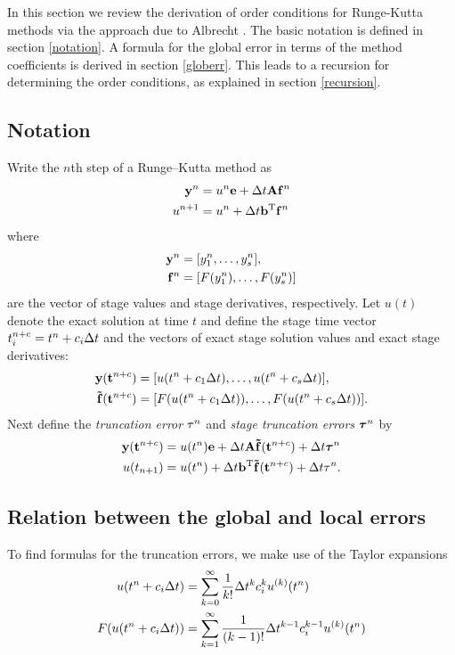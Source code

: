 In this section we review the derivation of order conditions for Runge-Kutta
methods via the approach due to Albrecht \cite{albrecht1996}.
The basic notation is defined in section \ref{notation}.  A formula 
for the global error in terms of the method coefficients is derived
in section \ref{globerr}.  This leads to a recursion for determining the order 
conditions, as explained in section \ref{recursion}.

\subsection{Notation\label{notation}}
Write the $n$th step of a Runge--Kutta method as
\begin{subequations} \label{eq:rk}
\begin{align} 
\mathbf{y}^n & = u^{n}\mathbf{e} + \Delta t \mathbf{A} \mathbf{f}^{n} \\
u^{n+1} & = u^{n} + \Delta t \mathbf{b}^\mathrm{T} \mathbf{f}^{n}
\end{align}
\end{subequations}
where 
\begin{align*}
\mathbf{y}^n & = [y_1^n,\dots,y_s^n], \\
\mathbf{f}^n & = [F(y_1^n),\dots,F(y_s^n)]
\end{align*}
are the vector of stage values and stage derivatives, respectively.
Let $u(t)$ denote the exact solution at time $t$ and define
the stage time vector $t^{n+c}_i = t^n+c_i\Delta t$ and
the vectors of exact stage solution values and
exact stage derivatives:
\begin{align*}
    \mathbf{y}(\mathbf{t}^{n+c}) & = [u(t^n+c_1\Delta t),\dots,u(t^n+c_s\Delta t)], \\
    \mathbf{\tilde{f}}(\mathbf{t}^{n+c}) & = [F(u(t^n+c_1\Delta t)),\dots,F(u(t^n+c_s\Delta t))].
\end{align*}
Next define the {\em truncation error} $\tau^n$ and
{\em stage truncation errors} $\boldsymbol{\tau}^n$ by
\begin{subequations} \label{eq:rk_lte}
\begin{align} 
    \mathbf{y}(\mathbf{t}^{n+c}) & = u(t^{n})\mathbf{e} + \Delta t \mathbf{A} \mathbf{\tilde{f}}(\mathbf{t}^{n+c}) + \Delta t \boldsymbol{\tau}^n \\
    u(t_{n+1}) & = u(t^{n}) + \Delta t \mathbf{b}^\mathrm{T}\mathbf{\tilde{f}}(\mathbf{t}^{n+c}) + \Delta t \tau^n.
\end{align}
\end{subequations}

\subsection{Relation between the global and local errors\label{globerr}}
To find formulas for the truncation errors, we make use of 
the Taylor expansions
\begin{subequations} \label{eq:taylor}
\begin{align} 
u(t^{n}+c_i\Delta t) & = \sum_{k=0}^\infty \frac{1}{k!} \Delta t^k c_i^k u^{(k)}(t^{n}) \\
F(u(t^{n}+c_i\Delta t)) & = \sum_{k=1}^\infty \frac{1}{(k-1)!} \Delta t^{k-1} c_i^{k-1} u^{(k)}(t^{n})
\end{align}
\end{subequations}

